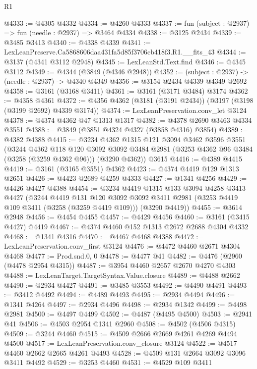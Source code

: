 \begin{lexlean}{R1}
\begin{coremodule}
@4333 := @4305 @4332
@4334 := @4260 @4333
@4337 := fun (subject : @2937) => fun (needle : @2937) => @3464 @4334
@4338 := @3125 @2434
@4339 := @3485 @3413
@4340 := @4338 @4339
@4341 := LexLeanPreserve.Ca5868606daa431fa5d85f3706cb418f3.R1.__fits_43
@4344 := @3137 (@4341 @3112 @2948)
@4345 := LexLeanStd.Text.find
@4346 := @4345 @3112
@4349 := @4344 (@3849 (@4346 @2948))
@4352 := (subject : @2937) -> (needle : @2937) -> @4340 @4349
@4356 := @3154 @2434 @4339 @4349 @2692
@4358 := @3161 (@3168 @3411)
@4361 := @3161 (@3171 @3484) @3174
@4362 := @4358 @4361
@4372 := @4356 @4362 (@3181 (@3191 @2434)) (@3197 (@3198 (@3199 @2692) @4339 @3174))
@4374 := LexLeanPreservation.conv_let @3124
@4378 := @4374 @4362 @47 @1313 @1317
@4382 := @4378 @2690 @3463 @4334 @3551
@4388 := @3849 (@3851 @4324 @4327 (@3858 @4316) @3854)
@4389 := @4382 @4388
@4415 := @3234
    @4362
    @1315
    @121
    @3094
    @3462
    @3596
    @3551
    (@3244
      @4362
      @118
      @120
      @3092
      @3092
      @3484
      @2981
      (@3253 @4362 @96 @3484 (@3258 (@3259 @4362 @96)))
      (@3290 @4362))
    @3615
@4416 := @4389 @4415
@4419 := @3161 (@3165 @3551) @4362
@4423 := @4374 @4419 @129 @1313 @2651
@4426 := @4423 @2689 @4259 @4333
@4427 := @1341 @4256
@4429 := @4426 @4427 @4388
@4454 := @3234
    @4419
    @1315
    @133
    @3094
    @4258
    @3413
    @4427
    (@3244
      @4419
      @131
      @120
      @3092
      @3092
      @3411
      @2981
      (@3253 @4419 @109 @3411 (@3258 (@3259 @4419 @109)))
      (@3290 @4419))
@4455 := @3614 @2948
@4456 := @4454 @4455
@4457 := @4429 @4456
@4460 := @3161 (@3415 @4427) @4419
@4467 := @4374 @4460 @152 @1313 @2672 @2688 @4304 @4332
@4468 := @1341 @4316
@4470 := @4467 @4468 @4388
@4472 := LexLeanPreservation.conv_first @3124
@4476 := @4472 @4460 @2671 @4304 @4468
@4477 := Prod.snd.{0, 0}
@4478 := @4477 @41
@4482 := @4476 (@2960 (@4478 @2954 @4315))
@4487 := @3954 @4460 @2657 @2670 @4270 @4303
@4488 := LexLeanTarget.TargetSyntax.Value.closure
@4489 := @4488 @2662
@4490 := @2934 @4427
@4491 := @3485 @3553
@4492 := @4490 @4491
@4493 := @3412 @4492
@4494 := @4489 @4493
@4495 := @2934 @4494
@4496 := @1341 @4264
@4497 := @2934 @4496
@4498 := @2934 @1342
@4499 := @4498 @2981
@4500 := @4497 @4499
@4502 := @4487 (@4495 @4500)
@4503 := @2941 @41
@4506 := @4503 @2954 @1341 @2960
@4508 := @4502 (@4506 @4315)
@4509 := @3244 @4460
@4515 := @4509 @2666 @2669 @4261 @4269 @4494 @4500
@4517 := LexLeanPreservation.conv_closure @3124
@4522 := @4517 @4460 @2662 @2665 @4261 @4493
@4528 := @4509 @131 @2664 @3092 @3096 @3411 @4492
@4529 := @3253 @4460
@4531 := @4529 @109 @3411

\end{coremodule}
\end{lexlean}
